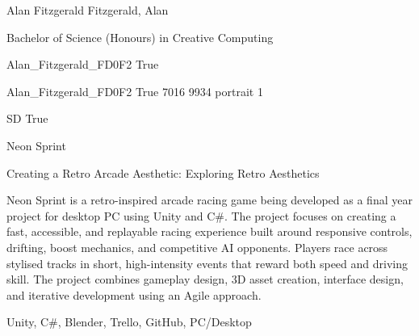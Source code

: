 
\begingroup{}\relax



\def\Key{Alan_Fitzgerald_FD0F2}

{Alan Fitzgerald}
{Fitzgerald, Alan}

{Bachelor of Science (Honours) in Creative Computing}

{Alan_Fitzgerald_FD0F2}
{True}

{Alan_Fitzgerald_FD0F2}
{True}
{7016}
{9934}
{portrait}
{1}

{SD}
{True}

{Neon Sprint}

{Creating a Retro Arcade Aesthetic: Exploring Retro Aesthetics}

{Neon Sprint is a retro-inspired arcade racing game being developed as a final year project for desktop PC using Unity and C\#. The project focuses on creating a fast, accessible, and replayable racing experience built around responsive controls, drifting, boost mechanics, and competitive AI opponents. Players race across stylised tracks in short, high-intensity events that reward both speed and driving skill. The project combines gameplay design, 3D asset creation, interface design, and iterative development using an Agile approach.}

{Unity, C\#, Blender, Trello, GitHub, PC/Desktop}

